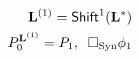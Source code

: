 \documentclass[preview]{standalone}
\begin{document}
\begin{align*}
\special{dvisvgm:raw <g id='unique000'>}\mathbf{L}^{(1)} = \mathsf{Shift}^1(\mathbf{L}^*)\\P_0^{\mathbf{L}^{(1)}} = P_1,\;\; \Box_{\text{Syn}}\phi_1\special{dvisvgm:raw </g>}
\end{align*}
\end{document}
